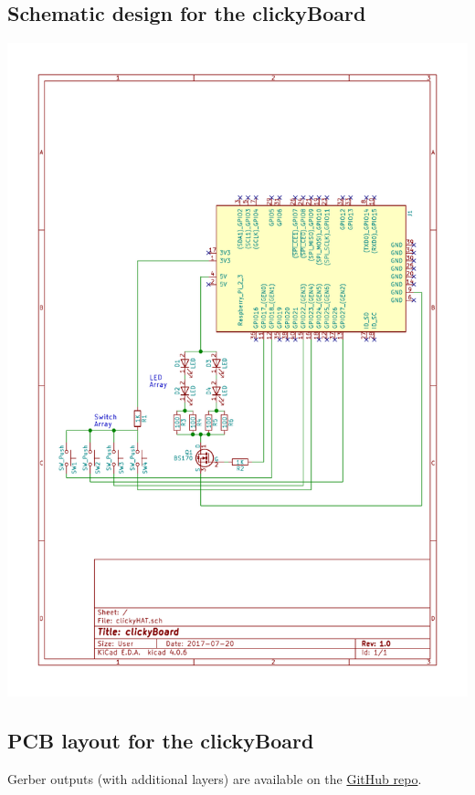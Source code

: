 \documentclass[10pt, a4paper, onesided]{article}
\begin{document}
	\subsection{Schematic design for the clickyBoard}
		\begin{center}
			\includegraphics[width=1\linewidth]{img/schematic}
		\end{center}
	
	\newpage
	\subsection{PCB layout for the clickyBoard}
		Gerber outputs (with additional layers) are available on the \href{https://github.com/SecretImbecile/clickyBoard}{GitHub repo}.
\end{document}
